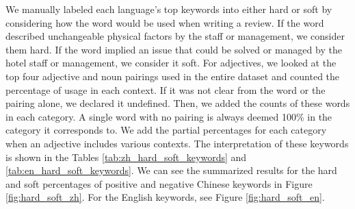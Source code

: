 \documentclass[smallextended,natbib]{svjour3}       %
\begin{document}
    We manually labeled each language's top keywords into either hard or soft by considering how the word would be used when writing a review. If the word described unchangeable physical factors by the staff or management, we consider them hard. If the word implied an issue that could be solved or managed by the hotel staff or management, we consider it soft. For adjectives, we looked at the top four adjective and noun pairings used in the entire dataset and counted the percentage of usage in each context. If it was not clear from the word or the pairing alone, we declared it undefined. Then, we added the counts of these words in each category. A single word with no pairing is always deemed 100\% in the category it corresponds to. We add the partial percentages for each category when an adjective includes various contexts. The interpretation of these keywords is shown in the Tables \ref{tab:zh_hard_soft_keywords} and \ref{tab:en_hard_soft_keywords}. We can see the summarized results for the hard and soft percentages of positive and negative Chinese keywords in Figure \ref{fig:hard_soft_zh}. For the English keywords, see Figure \ref{fig:hard_soft_en}.

\end{document}
